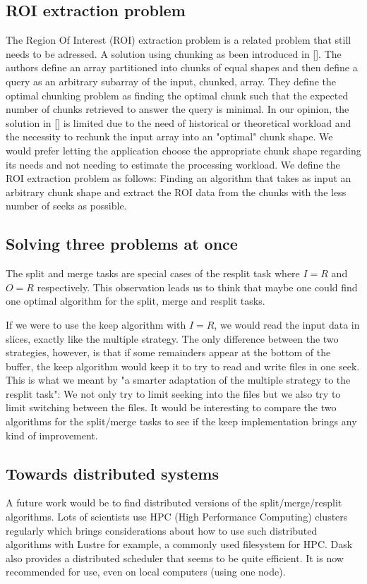 \documentclass[conference]{IEEEtran}
\begin{document}
\subsection{ROI extraction problem}
The Region Of Interest (ROI) extraction problem is a related problem that still needs
to be adressed. A solution using chunking as been introduced in []. The authors
define an array partitioned into chunks of equal shapes and then define a
query as an arbitrary subarray of the input, chunked, array. They define the
optimal chunking problem as finding the optimal chunk such that the expected
number of chunks retrieved to answer the query is minimal. In our opinion, the
solution in [] is limited due to the need of historical or theoretical workload
and the necessity to rechunk the input array into an "optimal" chunk shape. We
would prefer letting the application choose the appropriate chunk shape
regarding its needs and not needing to estimate the processing workload. We
define the ROI extraction problem as follows: Finding an algorithm that takes
as input an arbitrary chunk shape and extract the ROI data from the chunks with
the less number of seeks as possible.

\subsection{Solving three problems at once}
The split and merge tasks are special cases of the resplit task where $I=R$ and
$O=R$ respectively. This observation leads us to think that maybe one could
find one optimal algorithm for the split, merge and resplit tasks.

If we were to use the keep algorithm with $I=R$, we would read the input data
in slices, exactly like the multiple strategy. The only difference between the
two strategies, however, is that if some remainders appear at the bottom of the
buffer, the keep algorithm would keep it to try to read and write files in one
seek. This is what we meant by "a smarter adaptation of the multiple strategy
to the resplit task": We not only try to limit seeking into the files but we
also try to limit switching between the files. It would be interesting to
compare the two algorithms for the split/merge tasks to see if the keep
implementation brings any kind of improvement.

\subsection{Towards distributed systems}
A future work would be to find distributed versions of the split/merge/resplit
algorithms. Lots of scientists use HPC (High Performance Computing) clusters
regularly which brings considerations about how to use such distributed
algorithms with Lustre for example, a commonly used filesystem for HPC. Dask
also provides a distributed scheduler that seems to be quite efficient. It is
now recommended for use, even on local computers (using one node).  
\end{document}
